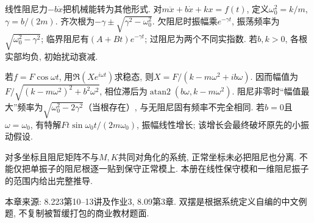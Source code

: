 线性阻尼力$-b\dot x$把机械能转为其他形式. 对$m\ddot x+b\dot x+kx=f(t)$, 定义$\omega_0^2=k/m$, $\gamma=b/(2m)$. 齐次根为$-\gamma\pm\sqrt{\gamma^2-\omega_0^2}$. 欠阻尼时振幅乘$e^{-\gamma t}$, 振荡频率为$\sqrt{\omega_0^2-\gamma^2}$; 临界阻尼有$(A+Bt)e^{-\gamma t}$; 过阻尼为两个不同实指数. 若$b,k>0$, 各根实部均负, 初始扰动衰减.

若$f=F\cos\omega t$, 用$\Re(Xe^{i\omega t})$求稳态, 则$X=F/(k-m\omega^2+ib\omega)$. 因而幅值为$F/\sqrt{(k-m\omega^2)^2+b^2\omega^2}$, 相位滞后为$\operatorname{atan2}(b\omega,k-m\omega^2)$. 阻尼非零时“幅值最大”频率为$\sqrt{\omega_0^2-2\gamma^2}$（当根存在）, 与无阻尼固有频率不完全相同. 若$b=0$且$\omega=\omega_0$, 有特解$Ft\sin\omega_0t/(2m\omega_0)$, 振幅线性增长; 该增长会最终破坏原先的小振动假设.

对多坐标且阻尼矩阵不与$M,K$共同对角化的系统, 正常坐标未必把阻尼也分离. 不能仅把单振子的阻尼根逐一贴到保守正常模上. 本册在线性保守模和一维阻尼振子的范围内给出完整推导.

本章来源: 8.223第10--13讲及作业3, 8.09第3章. 双摆是根据系统定义自编的中文例题, 不复制被暂缓打包的商业教材题面.


